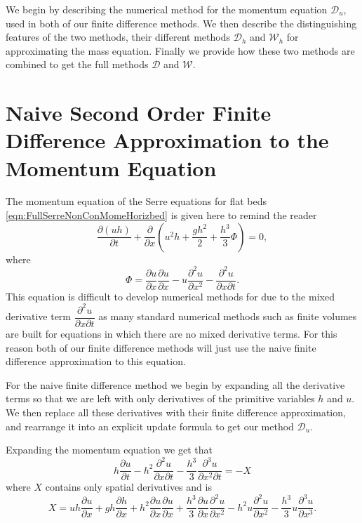 We begin by describing the numerical method for the momentum equation $\mathcal{D}_u$, used in both of our finite difference methods. We then describe the distinguishing features of the two methods, their different methods $\mathcal{D}_h$ and $\mathcal{W}_h$ for approximating the mass equation. Finally we provide how these two methods are combined to get the full methods $\mathcal{D}$ and $\mathcal{W}$.

\section{Naive Second Order Finite Difference Approximation to the Momentum Equation}
The momentum equation of the Serre equations for flat beds \eqref{eqn:FullSerreNonConMomeHorizbed} is given here to remind the reader
\begin{equation*}
\dfrac{\partial (uh)}{\partial t} + \dfrac{\partial}{\partial x} \left ( u^2h + \dfrac{gh^2}{2} + \dfrac{h^3}{3}{ \Phi }  \right ) = 0,
\end{equation*}
where 
\begin{equation*}
 { \Phi }  = \dfrac{\partial u }{\partial x} \dfrac{\partial u}{\partial x} -u \dfrac{\partial^2 u}{\partial x^2}  - \dfrac{\partial^2 u}{\partial x \partial t}.
\end{equation*}
This equation is difficult to develop numerical methods for due to the mixed derivative term $\dfrac{\partial^2 u}{\partial x \partial t}$ as many standard numerical methods such as finite volumes are built for equations in which there are no mixed derivative terms. For this reason both of our finite difference methods will just use the naive finite difference approximation to this equation.

For the naive finite difference method we begin by expanding all the derivative terms so that we are left with only derivatives of the primitive variables $h$ and $u$. We then replace all these derivatives with their finite difference approximation, and rearrange it into an explicit update formula to get our method $\mathcal{D}_u$.  

Expanding the momentum equation we get that
\begin{equation*}
h\dfrac{\partial u}{\partial t} - h^2\frac{\partial^2 u}{\partial x \partial t} - \frac{h^3}{3}\frac{\partial^3 u}{\partial x^2 \partial t}  = -X 
\label{eq:expandedu}
\end{equation*}
where $X$ contains only spatial derivatives and is
\begin{equation*}
X = uh\frac{\partial u}{\partial x} + gh\frac{\partial h}{\partial x} + h^2\frac{\partial u}{\partial x}\frac{\partial u}{\partial x} + \frac{h^3}{3}\frac{\partial u}{\partial x}\frac{\partial^2 u}{\partial x^2} - h^2u\frac{\partial^2 u}{\partial x^2}- \frac{h^3}{3}u\frac{\partial^3 u}{\partial x^3} .
\end{equation*}

